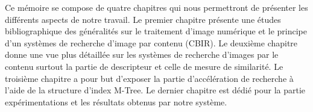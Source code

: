 Ce mémoire se compose de quatre chapitres qui nous permettront de
présenter les différents aspects de notre travail. Le premier chapitre présente une études bibliographique des généralités sur le traitement d’image numérique et le principe d'un systèmes de recherche d’image par contenu (CBIR). Le deuxième chapitre donne une vue plus détaillée sur les systèmes de recherche d’images par le contenu surtout la partie de descripteur et celle de mesure de similarité. Le troisième chapitre a pour but d’exposer la partie d'accélération de recherche à l'aide de la structure d'index M-Tree. Le dernier chapitre est dédié pour la partie expérimentations et les résultats obtenus par notre système.